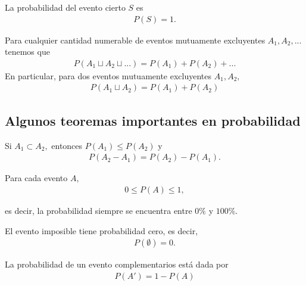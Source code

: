 \begin{axiom}
   La probabilidad del evento cierto $S$ es
   \begin{align}
   \label{1.2}
    P(S)=1.
   \end{align}
\end{axiom}



\begin{axiom}
  Para cualquier cantidad numerable de eventos mutuamente excluyentes
  $A_{1},A_{2},...$ tenemos que
  \begin{align}
   \label{1.3}
   P(A_{1}\sqcup A_{2} \sqcup ...)=P(A_{1})+P(A_{2})+...
  \end{align}
En particular, para dos eventos mutuamente excluyentes $A_{1},A_{2},$
\begin{align}
	\label{1.4}
 P(A_{1}\sqcup A_{2})=P(A_{1})+P(A_{2})
\end{align}

\end{axiom}


\subsection{Algunos teoremas importantes en probabilidad}
{}
	\begin{thm}
	 \label{thm:1.1}
	 Si $A_{1}\subset A_{2},$ entonces $P(A_{1})\leq P(A_{2})$ y
	 \begin{align*}
		P(A_{2}-A_{1})=P(A_{2})-P(A_{1}).
\end{align*}
	\end{thm}


{}
\begin{thm}
 \label{thm:1.2}
 Para cada evento $A$,
 \begin{align}
  \label{1.5}
  0\leq P(A) \leq 1,
 \end{align}

es decir, la probabilidad siempre se encuentra entre $0\%$ y $100\%.$
\end{thm}


\begin{thm}
	\label{thm:1.3}
 El evento imposible tiene probabilidad cero, es decir,
 \begin{align}
  P(\emptyset)=0.
 \end{align}
\end{thm}


{}
\begin{thm}
 \label{thm:1.4} La probabilidad de un evento complementarios está dada por
 \begin{align}
 \label{1.7}
   P(A')=1-P(A)
  \end{align}
\end{thm}



